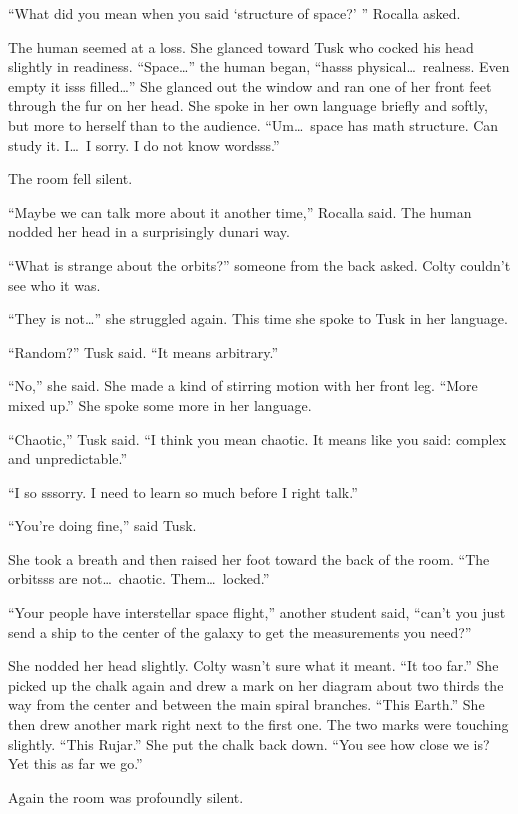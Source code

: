 ``What did you mean when you said `structure of space?' '' Rocalla asked.

The human seemed at a loss. She glanced toward Tusk who cocked his head slightly in readiness.
``Space\ldots'' the human began, ``hasss physical\ldots\ realness. Even empty it isss
filled\ldots'' She glanced out the window and ran one of her front feet through the fur on her
head. She spoke in her own language briefly and softly, but more to herself than to the
audience. ``Um\ldots\ space has math structure. Can study it. I\ldots\ I sorry. I do not know
wordsss.''

The room fell silent.

``Maybe we can talk more about it another time,'' Rocalla said. The human nodded her head in a
surprisingly dunari way.

``What is strange about the orbits?'' someone from the back asked. Colty couldn't see who it
was.

``They is not\ldots'' she struggled again. This time she spoke to Tusk in her language.

``Random?'' Tusk said. ``It means arbitrary.''

``No,'' she said. She made a kind of stirring motion with her front leg. ``More mixed up.'' She
spoke some more in her language.

``Chaotic,'' Tusk said. ``I think you mean chaotic. It means like you said: complex and
unpredictable.''

``I so sssorry. I need to learn so much before I right talk.''

``You're doing fine,'' said Tusk.

She took a breath and then raised her foot toward the back of the room. ``The orbitsss are
not\ldots\ chaotic. Them\ldots\ locked.''

``Your people have interstellar space flight,'' another student said, ``can't you just send a
ship to the center of the galaxy to get the measurements you need?''

She nodded her head slightly. Colty wasn't sure what it meant. ``It too far.'' She picked up the
chalk again and drew a mark on her diagram about two thirds the way from the center and between
the main spiral branches. ``This Earth.'' She then drew another mark right next to the first
one. The two marks were touching slightly. ``This Rujar.'' She put the chalk back down. ``You
see how close we is? Yet this as far we go.''

Again the room was profoundly silent.

